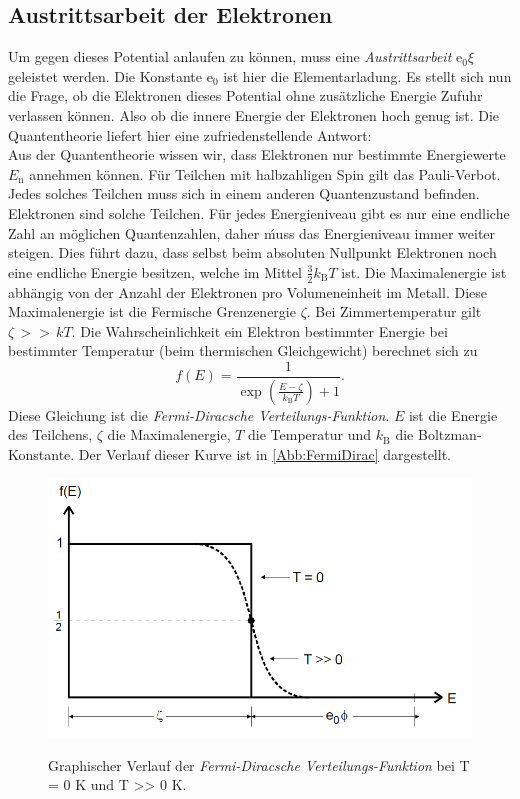 \subsection{Austrittsarbeit der Elektronen}

Um gegen dieses Potential anlaufen zu können, muss eine
\textit{Austrittsarbeit} $\mathrm{e}_0 \xi$ geleistet
werden. Die Konstante $\mathrm{e}_0$ ist hier die
Elementarladung.
Es stellt sich nun die Frage, ob die Elektronen dieses
Potential ohne zusätzliche Energie Zufuhr verlassen können.
Also ob die innere Energie der Elektronen hoch genug ist.
Die Quantentheorie liefert hier eine zufriedenstellende 
Antwort:\\
Aus der Quantentheorie wissen wir, dass Elektronen 
nur bestimmte Energiewerte $E_{\mathrm{n}}$ annehmen können.
Für Teilchen mit halbzahligen Spin gilt das Pauli-Verbot.
Jedes solches Teilchen muss sich in einem anderen Quantenzustand
befinden. Elektronen sind solche Teilchen. Für jedes Energieniveau
gibt es nur eine endliche Zahl an möglichen Quantenzahlen,
daher ḿuss das Energieniveau immer weiter steigen.
Dies führt dazu, dass selbst beim absoluten Nullpunkt
Elektronen noch eine endliche Energie besitzen, welche im 
Mittel $\frac{3}{2} k_{\mathrm{B}} T$ ist. Die Maximalenergie
ist abhängig von der Anzahl der Elektronen pro Volumeneinheit 
im Metall. Diese Maximalenergie ist die Fermische Grenzenergie
$\zeta$. Bei Zimmertemperatur gilt $\zeta \, >> \, kT$. Die
Wahrscheinlichkeit ein Elektron bestimmter Energie bei 
bestimmter Temperatur (beim thermischen Gleichgewicht) berechnet
sich zu 
\begin{equation}
    \label{eqn:FermiDirac}
    f(E) = \frac{1}{\exp{\left(\frac{E - \zeta}{k_{\mathrm{B}}T}\right)}+1}.
\end{equation}
Diese Gleichung ist die \textit{Fermi-Diracsche Verteilungs-Funktion}.
$E$ ist die Energie des Teilchens, $\zeta$ die Maximalenergie,
$T$ die Temperatur und $k_{\mathrm{B}}$ die Boltzman-Konstante.
Der Verlauf dieser Kurve ist in \autoref{Abb:FermiDirac} dargestellt.

\begin{figure}[H]
    \centering
    \caption{Graphischer Verlauf der \textit{Fermi-Diracsche Verteilungs-Funktion} bei T = 0 K und T >> 0 K.\cite{sample}}
    \includegraphics[width=\textwidth]{Bilder/FermiDirac.png}
    \label{Abb:FermiDirac}
\end{figure}

